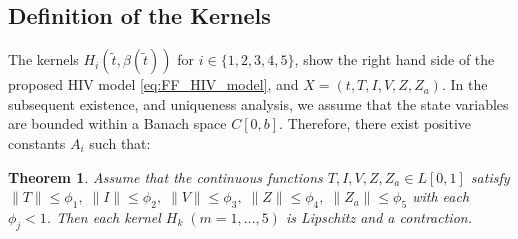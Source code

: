 \documentclass[10pt,a4paper]{amsart}
\newtheorem{theorem}{Theorem}[section]
\numberwithin{equation}{section}
\begin{document}
\subsection{Definition of the Kernels}
The kernels $H_i(\tilde{t}, \beta(\tilde{t}))$ for $i \in \{1, 2, 3, 4, 5\}$, show the right hand side of the proposed HIV model \eqref{eq:FF_HIV_model}, and $ X = (t, T, I, V, Z, Z_a)$.
In the subsequent existence, and uniqueness analysis, we assume that the state variables are bounded within a Banach space $C[0, b]$. Therefore, there exist positive constants $A_i$ such that:
\begin{theorem}
Assume that the continuous functions \(T, I, V, Z, Z_a \in L[0,1]\) satisfy 
\(\|T\| \leq \phi_1,\; \|I\| \leq \phi_2,\; \|V\| \leq \phi_3,\; \|Z\| \leq \phi_4,\; \|Z_a\| \leq \phi_5\) 
with each \(\phi_j < 1\). Then each kernel \(H_k\;(m=1,\dots,5)\) is Lipschitz and a contraction.
\end{theorem}
\end{document}
